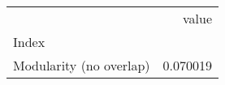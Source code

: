 \begin{tabular}{lr}
\toprule
{} &     value \\
Index                   &           \\
\midrule
Modularity (no overlap) &  0.070019 \\
\bottomrule
\end{tabular}
